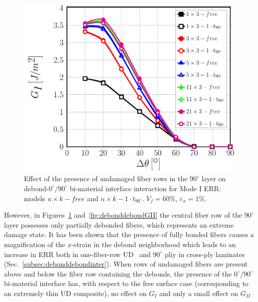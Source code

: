 \documentclass[review]{elsarticle}
\begin{document}
\begin{figure}[!h]
\centering
\includegraphics[width=\textwidth]{nxk-1-vf60-GI.pdf}
\caption{Effect of the presence of undamaged fiber rows in the $90^{\circ}$ layer on debond-$0^{\circ}/90^{\circ}$ bi-material interface interaction for Mode I ERR: models $n\times k-free$ and $n\times k-1\cdot t_{90^{\circ}}$. $V_{f}=60\%$, $\varepsilon_{x}=1\%$.}\label{fig:debonddebondGI}
\end{figure}

However, in Figures~\ref{fig:debonddebondGI} and~\ref{fig:debonddebondGII} the central fiber row of the $90^{\circ}$ layer possesses only partially debonded fibers, which represents an extreme damage state. It has been shown that the presence of fully bonded fibers causes a magnification of the $x$-strain in the debond neighborhood which leads to an increase in ERR both in one-fiber-row UD~\cite{DiStasio2019} and $90^{\circ}$ pliy in cross-ply laminates (Sec.~\ref{subsec:debonddebondinter}). When rows of undamaged fibers are present above and below the fiber row containing the debonds, the presence of the $0^{\circ}/90^{\circ}$ bi-material interface has, with respect to the free surface case (corresponding to an extremely thin UD composite), no effect on $G_{I}$ and only a small effect on $G_{II}$
\end{document}
